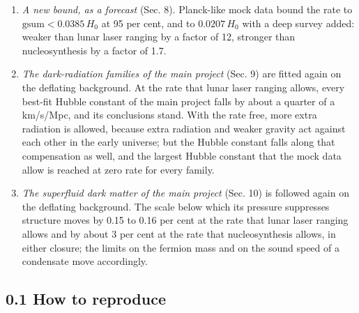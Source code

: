 \documentclass[
  10pt,
]{article}
\begin{document}
\begin{enumerate}
  first reported: \(d\ln H_0/d(\mathrm{gsum}/H_0)=-0.969\). In fits of
  all six parameters of the standard model to mock data it falls faster
  still, by 84 km/s/Mpc per unit of \(\mathrm{gsum}/H_0\). Deflation
  cannot raise the Hubble constant inferred from the microwave
  background.
\item
  \emph{A new bound, as a forecast} (Sec. 8). Planck-like mock data
  bound the rate to \(\mathrm{gsum}<0.0385\,H_0\) at 95 per cent, and to
  \(0.0207\,H_0\) with a deep survey added: weaker than lunar laser
  ranging by a factor of 12, stronger than nucleosynthesis by a factor
  of 1.7.
\item
  \emph{The dark-radiation families of the main project} (Sec. 9) are
  fitted again on the deflating background. At the rate that lunar laser
  ranging allows, every best-fit Hubble constant of the main project
  falls by about a quarter of a km/s/Mpc, and its conclusions stand.
  With the rate free, more extra radiation is allowed, because extra
  radiation and weaker gravity act against each other in the early
  universe; but the Hubble constant falls along that compensation as
  well, and the largest Hubble constant that the mock data allow is
  reached at zero rate for every family.
\item
  \emph{The superfluid dark matter of the main project} (Sec. 10) is
  followed again on the deflating background. The scale below which its
  pressure suppresses structure moves by 0.15 to 0.16 per cent at the
  rate that lunar laser ranging allows and by about 3 per cent at the
  rate that nucleosynthesis allows, in either closure; the limits on the
  fermion mass and on the sound speed of a condensate move accordingly.
\end{enumerate}

\hypertarget{how-to-reproduce}{%
\subsection{0.1 How to reproduce}\label{how-to-reproduce}}
\end{document}
